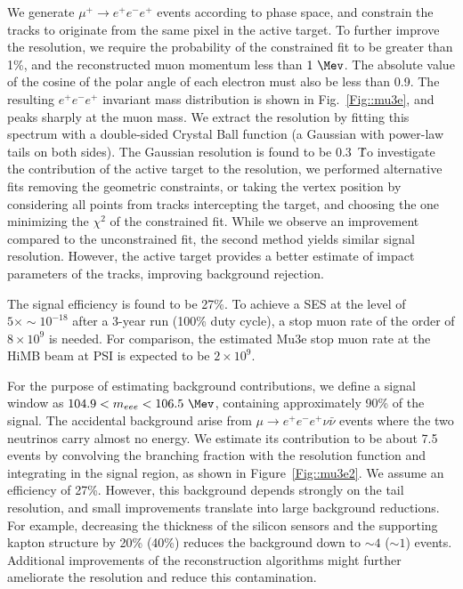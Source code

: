 We generate $\mu^+ \rightarrow e^+e^-e^+$ events according to phase space, and constrain the tracks to originate from the same pixel in the active target. To further improve the resolution, we require the probability of the constrained fit to be greater than 1\%, and the reconstructed muon momentum less than $1 ~\Mev$. The absolute value of the cosine of the polar angle of each electron must also be less than 0.9. The resulting $e^+e^-e^+$ invariant mass distribution is shown in Fig.~\ref{Fig::mu3e}, and peaks sharply at the muon mass. We extract the resolution by fitting this spectrum with a double-sided Crystal Ball function (a Gaussian with power-law tails on both sides). The Gaussian resolution is found to be 0.3~\Mev\. To investigate the contribution of the active target to the resolution, we performed alternative fits removing the geometric constraints, or taking the vertex position by considering all points from tracks intercepting the target, and choosing the one minimizing the $\chi^2$ of the constrained fit. While we observe an improvement compared to the unconstrained fit, the second method yields similar signal resolution. However, the active target provides a better estimate of impact parameters of the tracks, improving background rejection.

The signal efficiency is found to be 27\%. To achieve a SES at the level of $5\times\sim 10^{-18}$ after a 3-year run (100\% duty cycle), a stop muon rate of the order of $8\times 10^{9}$ is needed. For comparison, the estimated Mu3e stop muon rate at the HiMB beam at PSI is expected to be $2\times 10^{9}$.   

For the purpose of estimating background contributions, we define a signal window as $ 104.9 < m_{eee} < 106.5 ~\Mev$, containing approximately 90\% of the signal. The accidental background arise from $\mu \rightarrow e^+e^-e^+ \nu\bar\nu$ events where the two neutrinos carry almost no energy. We estimate its contribution to be about 7.5 events by convolving the branching fraction with the resolution function and integrating in the signal region, as shown in Figure~\ref{Fig::mu3e2}. We assume an efficiency of 27\%. However, this background depends strongly on the tail resolution, and small improvements translate into large background reductions. For example, decreasing the thickness of the silicon sensors and the supporting kapton structure by 20\% (40\%) reduces the background down to $\sim 4$ ($\sim 1$) events. Additional improvements of the reconstruction algorithms might further ameliorate the resolution and reduce this contamination.

